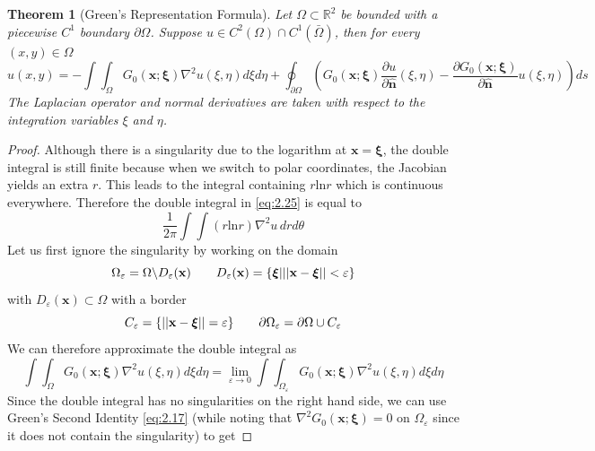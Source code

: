 \documentclass{article}
\newcommand{\R}{\mathbb{R}}
\newcommand{\pd}[2]{\frac{\partial #1}{\partial #2}}
\newcommand{\vb}[1]{\mathbf{ #1}}
\newcommand{\lap}{\nabla ^2}
\newcommand{\pull}{\! \! \!}
\newcommand{\dint}{\int \pull \int}
\newcommand{\fsgf}{G_0(\vb{x};\boldsymbol{\xi})}
\newcommand{\un}{\mathbf{\hat{n}}}
\newtheorem{theorem}{Theorem}[section]
\numberwithin{equation}{section}
\begin{document}
\begin{theorem}[Green's Representation Formula]
    Let $\Omega \subset \R^2$ be bounded with a piecewise $C^1$ boundary $\partial \Omega$. Suppose $u\in C^2(\Omega) \cap C^1(\bar{\Omega})$, then for every $(x,y) \in \Omega$ 
    \begin{equation}
        u(x,y) = -\dint_\Omega \fsgf \lap u(\xi,\eta)d\xi d\eta + \oint_{\partial \Omega} \left(\fsgf \pd{u}{\un}(\xi,\eta) -\pd{\fsgf}{\un}u(\xi,\eta) \right)ds \label{eq:2.25}
    \end{equation}
    The Laplacian operator and normal derivatives are taken with respect to the integration variables $\xi$ and $\eta$.
\end{theorem}
\begin{proof}
    Although there is a singularity due to the logarithm at $\vb{x} = \boldsymbol{\xi}$, the double integral is still finite because when we switch to polar coordinates, the Jacobian yields an extra $r$. This leads to the integral containing $r$ln$r$ which is continuous everywhere. Therefore the double integral in \eqref{eq:2.25} is equal to 
    \begin{equation*}
        \frac{1}{2\pi}\dint(r\text{ln}r)\lap u \,drd\theta
    \end{equation*}
    Let us first ignore the singularity by working on the domain 
    \begin{equation*}
        \Omega_\varepsilon = \Omega \backslash D_\varepsilon (\vb{x}) \hspace{20pt} D_\varepsilon (\vb{x})=\{\boldsymbol{\xi} \space | \space ||\vb{x}-\boldsymbol{\xi}|| < \varepsilon \}
    \end{equation*}
    with $D_\varepsilon(\vb{x}) \subset\Omega$ with a border 
    \begin{equation*}
        C_\varepsilon = \{ ||\vb{x}-\boldsymbol{\xi}|| = \varepsilon\} \hspace{20pt} \partial\Omega_\varepsilon = \partial\Omega \space \cup C_\varepsilon
    \end{equation*}
    We can therefore approximate the double integral as 
    \begin{equation}
        \dint_\Omega \fsgf \lap u(\xi, \eta) d\xi d\eta = \lim_{\varepsilon\rightarrow0} \dint_{\Omega_\varepsilon} \fsgf \lap u(\xi, \eta) d\xi d\eta
    \end{equation}
    Since the double integral has no singularities on the right hand side, we can use Green's Second Identity \eqref{eq:2.17} (while noting that $\lap \fsgf=0$ on $\Omega_\varepsilon$ since it does not contain the singularity) to get

\end{proof}
\end{document}

